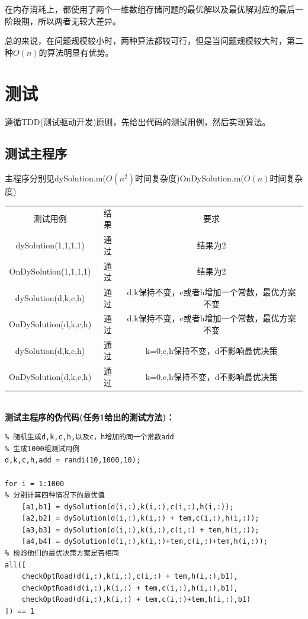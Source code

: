 \documentclass[UTF8]{ctexart}
\begin{document}
在内存消耗上，都使用了两个一维数组存储问题的最优解以及最优解对应的最后一阶段期，所以两者无较大差异。

总的来说，在问题规模较小时，两种算法都较可行，但是当问题规模较大时，第二种\(O(n)\)的算法明显有优势。



\section{测试}
遵循TDD(测试驱动开发)原则，先给出代码的测试用例，然后实现算法。

\subsection{测试主程序}
主程序分别见dySolution.m(\(O(n^2)\)时间复杂度)\quad OnDySolution.m(\(O(n)\)时间复杂度)

\begin{tabular}{c c c}
	\hline
	测试用例 & 结果 & 要求 \\
	dySolution(1,1,1,1) & 通过 & 结果为2 \\
	OnDySolution(1,1,1,1) & 通过 & 结果为2\\
	dySolution(d,k,c,h) & 通过 & d,k保持不变，c或者h增加一个常数，最优方案不变 \\
	OnDySolution(d,k,c,h) & 通过 & d,k保持不变，c或者h增加一个常数，最优方案不变\\	
	dySolution(d,k,c,h) & 通过 & k=0,c,h保持不变，d不影响最优决策 \\
	OnDySolution(d,k,c,h) & 通过 & k=0,c,h保持不变，d不影响最优决策\\
	\hline
\end{tabular}

~\\

\textbf{测试主程序的伪代码(任务1给出的测试方法)：}
\begin{lstlisting}
% 随机生成d,k,c,h,以及c，h增加的同一个常数add
% 生成1000组测试用例
d,k,c,h,add = randi(10,1000,10);

for i = 1:1000
% 分别计算四种情况下的最优值
	[a1,b1] = dySolution(d(i,:),k(i,:),c(i,:),h(i,:));
	[a2,b2] = dySolution(d(i,:),k(i,:) + tem,c(i,:),h(i,:));
	[a3,b3] = dySolution(d(i,:),k(i,:),c(i,:) + tem,h(i,:));
	[a4,b4] = dySolution(d(i,:),k(i,:)+tem,c(i,:)+tem,h(i,:));
% 检验他们的最优决策方案是否相同
all([
	checkOptRoad(d(i,:),k(i,:),c(i,:) + tem,h(i,:),b1),
	checkOptRoad(d(i,:),k(i,:) + tem,c(i,:),h(i,:),b1),
	checkOptRoad(d(i,:),k(i,:) + tem,c(i,:)+tem,h(i,:),b1)
]) == 1

\end{lstlisting}
\end{document}
